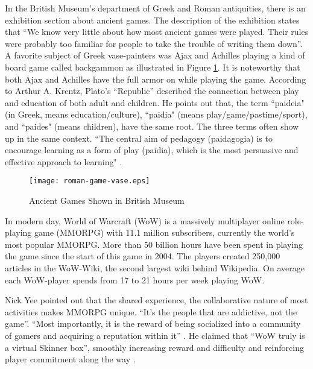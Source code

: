 In the British Museum's department of Greek and Roman antiquities, there is an exhibition section about ancient games. The description of the exhibition states that ``We know very little about how most ancient games were played. Their rules were probably too familiar for people to take the trouble of writing them down''.  A favorite subject of Greek vase-painters was Ajax and Achilles playing a kind of board game called backgammon as illustrated in Figure \ref{fig:ancient-games}. It is noteworthy that both Ajax and Achilles have the full armor on while playing the game. According to Arthur A. Krentz, Plato's ``Republic'' described the connection between play and education of both adult and children. He points out that, the term ``paideia" (in Greek, means education/culture), ``paidia" (means play/game/pastime/sport), and ``paides" (means children), have the same root. The three terms often show up in the same context. ``The central aim of pedagogy (paidagogia) is to encourage learning as a form of play (paidia), which is the most persuasive and effective approach to learning" \cite{krentz1998play}.

\begin{figure}[htbp]
	\centering
		\texttt{[image: roman-game-vase.eps]}
		\caption{Ancient Games Shown in British Museum}
		\label{fig:ancient-games}
\end{figure}

In modern day, World of Warcraft (WoW) is a massively multiplayer online role-playing game (MMORPG) with 11.1 million subscribers, currently the world's most popular MMORPG.  More than 50 billion hours have been spent in playing the game since the start of this game in 2004. The players created 250,000 articles in the WoW-Wiki, the second largest wiki behind Wikipedia. On average each WoW-player spends from 17 to 21 hours per week playing WoW.

Nick Yee pointed out that the shared experience, the collaborative nature of most activities makes MMORPG unique. ``It's the people that are addictive, not the game''. ``Most importantly, it is the reward of being socialized into a community of gamers and acquiring a reputation within it''  \cite {yee2002understanding}. He claimed that ``WoW truly is a virtual Skinner box'', smoothly increasing reward and difficulty and reinforcing player commitment along the way \cite {yee2001vsb}. 
	
